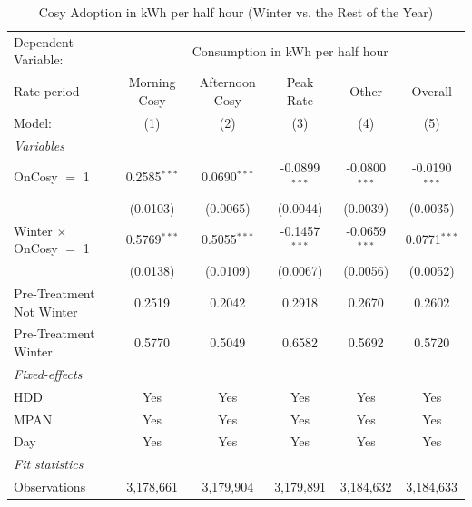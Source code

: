 
\begin{table}[htbp]
   \caption{\label{tab:did-seasons} Cosy Adoption in kWh per half hour (Winter vs. the Rest of the Year)}
   \centering
   \begin{tabular}{lccccc}
      \tabularnewline \midrule \midrule
      Dependent Variable: & \multicolumn{5}{c}{Consumption in kWh per half hour}\\
      Rate period                    & Morning Cosy   & Afternoon Cosy & Peak Rate       & Other           & Overall \\   
      Model:                         & (1)            & (2)            & (3)             & (4)             & (5)\\  
      \midrule
      \emph{Variables}\\
      OnCosy $=$ 1                   & 0.2585$^{***}$ & 0.0690$^{***}$ & -0.0899$^{***}$ & -0.0800$^{***}$ & -0.0190$^{***}$\\   
                                     & (0.0103)       & (0.0065)       & (0.0044)        & (0.0039)        & (0.0035)\\   
      Winter $\times$ OnCosy $=$ 1   & 0.5769$^{***}$ & 0.5055$^{***}$ & -0.1457$^{***}$ & -0.0659$^{***}$ & 0.0771$^{***}$\\   
                                     & (0.0138)       & (0.0109)       & (0.0067)        & (0.0056)        & (0.0052)\\   
      \midrule
      Pre-Treatment Not Winter       & 0.2519         & 0.2042         & 0.2918          & 0.2670          & 0.2602\\  
      Pre-Treatment Winter           & 0.5770         & 0.5049         & 0.6582          & 0.5692          & 0.5720\\  
\midrule
      \emph{Fixed-effects}\\
      HDD                            & Yes            & Yes            & Yes             & Yes             & Yes\\  
      MPAN                           & Yes            & Yes            & Yes             & Yes             & Yes\\  
      Day                            & Yes            & Yes            & Yes             & Yes             & Yes\\  
      \midrule
      \emph{Fit statistics}\\
      Observations                   & 3,178,661      & 3,179,904      & 3,179,891       & 3,184,632       & 3,184,633\\  

\end{tabular}
\end{table}
